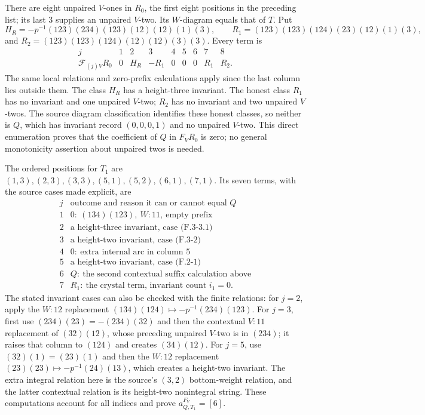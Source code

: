There are eight unpaired $V$-ones in $R_0$, the first eight
positions in the preceding list; its last $3$ supplies an unpaired
$V$-two. Its $W$-diagram equals that of $T$. Put
\[
 H_R=-p^{-1}(123)(234)(123)(12)(12)(1)(3),\qquad
 R_1=(123)(123)(124)(23)(12)(1)(3),
\]
and $R_2=(123)(123)(124)(12)(12)(3)(3)$. Every term is
\[
\begin{array}{c|rrrrrrrr}
j&1&2&3&4&5&6&7&8\\\hline
\mathcal F_{(j)V}R_0&0&H_R&-R_1&0&0&0&R_1&R_2.
\end{array}
\]
The same local relations and zero-prefix calculations apply since
the last column lies outside them. The class $H_R$ has a height-three
invariant. The honest class $R_1$ has no invariant and one unpaired
$V$-two; $R_2$ has no invariant and two unpaired $V$-twos. The source
diagram classification identifies these honest classes, so neither
is $Q$, which has invariant record $(0,0,0,1)$ and no unpaired
$V$-two. This direct enumeration proves that the coefficient of
$Q$ in $F_VR_0$ is zero; no general monotonicity assertion about
unpaired twos is needed.

The ordered positions for $T_1$ are
$(1,3),(2,3),(3,3),(5,1),(5,2),(6,1),(7,1)$.
Its seven terms, with the source cases made explicit, are
\[
\begin{array}{c|l}
j&\text{outcome and reason it can or cannot equal }Q\\\hline
1&0:\ (134)(123),\ W:11,\ \text{empty prefix}\\
2&\text{a height-three invariant, case (F.3-3.1)}\\
3&\text{a height-two invariant, case (F.3-2)}\\
4&0:\ \text{extra internal arc in column }5\\
5&\text{a height-two invariant, case (F.2-1)}\\
6&Q:\ \text{the second contextual suffix calculation above}\\
7&R_1:\ \text{the crystal term, invariant count }i_1=0.
\end{array}
\]
The stated invariant cases can also be checked with the finite
relations: for $j=2$, apply the $W:12$ replacement
$(134)(124)\mapsto-p^{-1}(234)(123)$. For $j=3$, first use
$(234)(23)=-(234)(32)$ and then the contextual $V:11$ replacement
of $(32)(12)$, whose preceding unpaired $V$-two is in $(234)$;
it raises that column to $(124)$ and creates $(34)(12)$.
For $j=5$, use $(32)(1)=(23)(1)$ and then the $W:12$ replacement
$(23)(23)\mapsto-p^{-1}(24)(13)$, which creates a height-two
invariant. The extra integral relation here is the source's
$(3,2)$ bottom-weight relation, and the latter contextual relation
is its height-two nonintegral string. These computations account
for all indices and prove $a^{F_V}_{Q,T_1}=[6]$.

